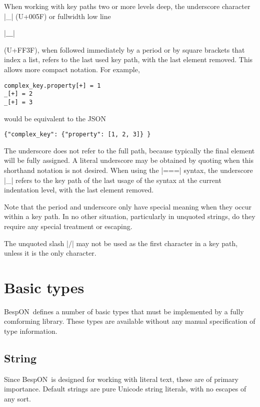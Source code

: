 \documentclass[11pt]{article}
\newcommand{\bespon}{BespON}
\begin{document}
When working with key paths two or more levels deep, the underscore character |_| (U+005F) or fullwidth low line \begin{CJK*}{UTF8}{gkai}|＿|\end{CJK*} (U+FF3F), when followed immediately by a period or by square brackets that index a list, refers to the last used key path, with the last element removed.  This allows more compact notation.  For example,
\begin{Verbatim}
complex_key.property[+] = 1
_[+] = 2
_[+] = 3
\end{Verbatim}
would be equivalent to the JSON
\begin{Verbatim}
{"complex_key": {"property": [1, 2, 3]} }
\end{Verbatim}
The underscore does not refer to the full path, because typically the final element will be fully assigned.  A literal underscore may be obtained by quoting when this shorthand notation is not desired.  When using the |===| syntax, the underscore |_| refers to the key path of the last usage of the syntax at the current indentation level, with the last element removed.

Note that the period and underscore only have special meaning when they occur within a key path.  In no other situation, particularly in unquoted strings, do they require any special treatment or escaping.

The unquoted slash |/| may not be used as the first character in a key path, unless it is the only character.



\section{Basic types}

\bespon\ defines a number of basic types that must be implemented by a fully comforming library.  These types are available without any manual specification of type information.

\subsection{String}

Since \bespon\ is designed for working with literal text, these are of primary importance.  Default strings are pure Unicode string literals, with no escapes of any sort.
\end{document}
